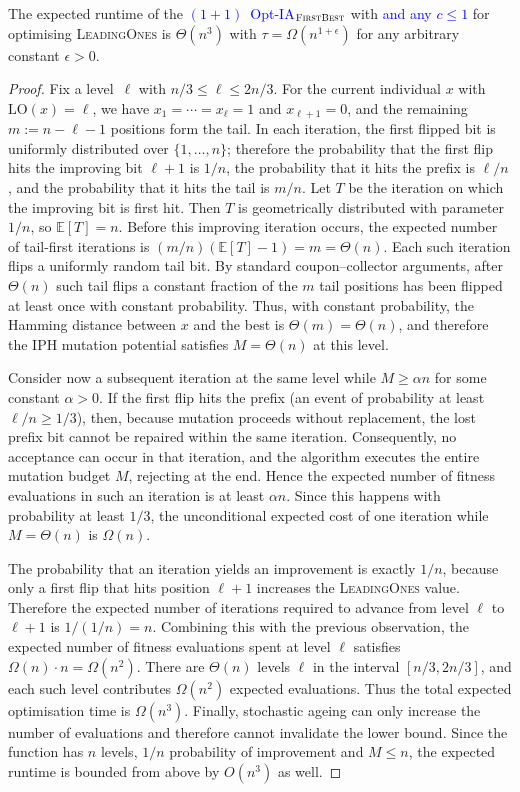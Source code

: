 \documentclass[lettersize,journal]{IEEEtran}
\newcommand{\new}[1]{\textcolor{blue}{#1}}
\begin{document}
\begin{theorem} \label{thm:leadingonesexpo}
The expected runtime of the \new{$(1+1)$~Opt-IA$_{\textsc{FirstBest}}$}  %
with {\linHD } \new{and any $c\leq 1$} for optimising
\textsc{LeadingOnes} is $\Theta(n^3)$ with $\tau=\Omega(n^{1+\epsilon})$ for any arbitrary 
constant $\epsilon>0$.
\end{theorem}
\begin{proof}
	
Fix a level~$\ell$ with $n/3\le \ell\le 2n/3$. For the current individual $x$ with $\mathrm{LO}(x)=\ell$, we have $x_1=\cdots=x_{\ell}=1$ and $x_{\ell+1}=0$, and the remaining $m:=n-\ell-1$ positions form the tail. In each iteration, the first flipped bit is uniformly distributed over $\{1,\dots,n\}$; therefore the probability that the first flip hits the improving bit $\ell+1$ is $1/n$, the probability that it hits the prefix is $\ell/n$, and the probability that it hits the tail is $m/n$. Let $T$ be the iteration on which the improving bit is first hit. Then $T$ is geometrically distributed with parameter~$1/n$, so $\mathbb{E}[T]=n$. Before this improving iteration occurs, the expected number of tail-first iterations is $(m/n)(\mathbb{E}[T]-1)=m=\Theta(n)$. Each such iteration flips a uniformly random tail bit. By standard coupon–collector arguments, after $\Theta(n)$ such tail flips a constant fraction of the $m$ tail positions has been flipped at least once with constant probability. Thus, with constant probability, the Hamming distance between $x$ and the best is $\Theta(m)=\Theta(n)$, and therefore the IPH mutation potential satisfies $M=\Theta(n)$ at this level.
	
	Consider now a subsequent iteration at the same level while $M\ge \alpha n$ for some constant $\alpha>0$. If the first flip hits the prefix (an event of probability at least $\ell/n\ge 1/3$), then, because mutation proceeds without replacement, the lost prefix bit cannot be repaired within the same iteration. Consequently, no acceptance can occur in that iteration, and the algorithm executes the entire mutation budget $M$, rejecting at the end. Hence the expected number of fitness evaluations in such an iteration is at least $\alpha n$. Since this happens with probability at least $1/3$, the unconditional expected cost of one iteration while $M=\Theta(n)$ is $\Omega(n)$.
	
	The probability that an iteration yields an improvement is exactly $1/n$, because only a first flip that hits position $\ell+1$ increases the \textsc{LeadingOnes} value. Therefore the expected number of iterations required to advance from level $\ell$ to $\ell+1$ is $1/(1/n)=n$. Combining this with the previous observation, the expected number of fitness evaluations spent at level $\ell$ satisfies $\Omega(n)\cdot n=\Omega(n^2)$.
	There are $\Theta(n)$ levels $\ell$ in the interval $[n/3,2n/3]$, and each such level contributes $\Omega(n^2)$ expected evaluations. Thus the total expected optimisation time is $\Omega(n^3)$. Finally, stochastic ageing can only increase the number of evaluations and therefore cannot invalidate the lower bound. Since the function has $n$ levels, $1/n$ probability of improvement and $M\leq n$, the expected runtime is bounded from above by $O(n^3)$ as well.
	

\end{proof}
\end{document}
